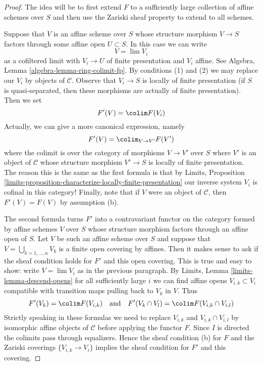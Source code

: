 \begin{proof}
The idea will be to first extend $F$ to a sufficiently large collection of
affine schemes over $S$ and then use the Zariski sheaf property to extend
to all schemes.

\medskip\noindent
Suppose that $V$ is an affine scheme over $S$ whose structure morphism
$V \to S$ factors through some affine open $U \subset S$. In this case
we can write
$$
V = \lim V_i
$$
as a cofiltered limit with $V_i \to U$ of finite presentation
and $V_i$ affine. See Algebra, Lemma \ref{algebra-lemma-ring-colimit-fp}.
By conditions (1) and (2)
we may replace our $V_i$ by objects of $\mathcal{C}$.
Observe that $V_i \to S$ is locally of finite presentation
(if $S$ is quasi-separated, then these morphisms are actually
of finite presentation). Then we set
$$
F'(V) = \colim F(V_i)
$$
Actually, we can give a more canonical expression, namely
$$
F'(V) = \colim_{V \to V'} F(V')
$$
where the colimit is over the category of morphisms $V \to V'$ over $S$
where $V'$ is an object of $\mathcal{C}$ whose structure
morphism $V' \to S$ is locally of finite presentation.
The reason this is the same as the first formula is that by
Limits, Proposition
\ref{limits-proposition-characterize-locally-finite-presentation}
our inverse system $V_i$ is cofinal in this category!
Finally, note that if $V$ were an object of $\mathcal{C}$,
then $F'(V) = F(V)$ by assumption (b).

\medskip\noindent
The second formula turns $F'$ into a contravariant functor
on the category formed by affine schemes $V$ over $S$ whose
structure morphism factors through an affine open of $S$.
Let $V$ be such an affine scheme over $S$ and
suppose that $V = \bigcup_{k = 1, \ldots, n} V_k$ is a finite open covering
by affines. Then it makes sense to ask if the sheaf condition
holds for $F'$ and this open covering.
This is true and easy to show: write $V = \lim V_i$ as in
the previous paragraph. By Limits, Lemma \ref{limits-lemma-descend-opens}
for all sufficiently large $i$ we can find affine opens
$V_{i, k} \subset V_i$ compatible with transition maps
pulling back to $V_k$ in $V$. Thus
$$
F'(V_k) = \colim F(V_{i, k})
\quad\text{and}\quad
F'(V_k \cap V_l) = \colim F(V_{i, k} \cap V_{i, l})
$$
Strictly speaking in these formulas we need to replace $V_{i, k}$ and
$V_{i, k} \cap V_{i, l}$ by isomorphic affine objects of $\mathcal{C}$
before applying the functor $F$.
Since $I$ is directed the colimits pass through equalizers.
Hence the sheaf condition (b) for $F$ and the Zariski coverings
$\{V_{i, k} \to V_i\}$ implies the sheaf
condition for $F'$ and this covering.


\end{proof}
